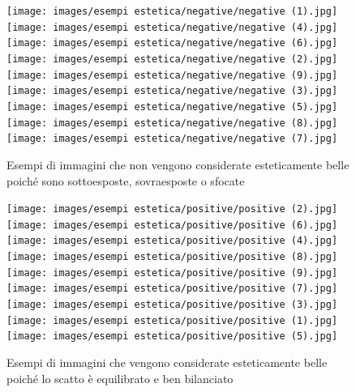 \begin{figure}[H]
\centering
\texttt{[image: images/esempi estetica/negative/negative (1).jpg]}
\quad
\texttt{[image: images/esempi estetica/negative/negative (4).jpg]}
\quad
\vspace{5mm}
\texttt{[image: images/esempi estetica/negative/negative (6).jpg]}\\
\quad
\texttt{[image: images/esempi estetica/negative/negative (2).jpg]}
\quad
\vspace{5mm}
\texttt{[image: images/esempi estetica/negative/negative (9).jpg]}
\quad
\texttt{[image: images/esempi estetica/negative/negative (3).jpg]}
\quad
\texttt{[image: images/esempi estetica/negative/negative (5).jpg]}
\quad
\vspace{5mm}
\texttt{[image: images/esempi estetica/negative/negative (8).jpg]}
\quad
\texttt{[image: images/esempi estetica/negative/negative (7).jpg]}
\caption{Esempi di immagini che non vengono considerate esteticamente belle poiché sono sottoesposte, sovraesposte o sfocate}
\label{estetica_negativa}
\end{figure}

\begin{figure}[H]
\centering
\texttt{[image: images/esempi estetica/positive/positive (2).jpg]}
\quad
\texttt{[image: images/esempi estetica/positive/positive (6).jpg]}
\quad
\vspace{5mm}
\texttt{[image: images/esempi estetica/positive/positive (4).jpg]}\\
\quad
\texttt{[image: images/esempi estetica/positive/positive (8).jpg]}
\quad
\vspace{5mm}
\texttt{[image: images/esempi estetica/positive/positive (9).jpg]}
\quad
\texttt{[image: images/esempi estetica/positive/positive (7).jpg]}
\quad
\texttt{[image: images/esempi estetica/positive/positive (3).jpg]}
\quad
\vspace{5mm}
\texttt{[image: images/esempi estetica/positive/positive (1).jpg]}
\quad
\texttt{[image: images/esempi estetica/positive/positive (5).jpg]}
\caption{Esempi di immagini che vengono considerate esteticamente belle poiché lo scatto è equilibrato e ben bilanciato}
\label{estetica_positiva}
\end{figure}



